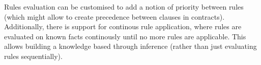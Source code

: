 Rules evaluation can be customised to add a notion of priority between rules (which might allow to create precedence between clauses in contracts).
Additionally, there is support for continous rule application, where rules are evaluated on known facts continously until no more rules are applicable.
This allows building a knowledge based through inference (rather than just evaluating rules sequentially).
